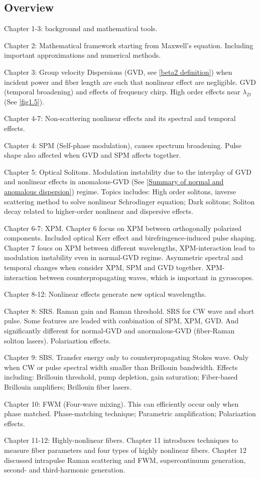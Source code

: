 \documentclass[12pt]{extarticle}
\numberwithin{equation}{section}
\numberwithin{figure}{section}
\numberwithin{table}{section}
\newcommand{\<}{\langle}
\renewcommand{\>}{\rangle}
\theoremstyle{definition}
\newcommand{\SubItem}[1]{
    {\setlength\itemindent{15pt} \item[-] #1}
}
\begin{document}
    \subsection{Overview}
        \begin{itemize}
            \item Chapter 1-3: background and mathematical tools.
                \SubItem{Chapter 2: Mathematical framework starting from Maxwell's equation. Including important approximations and numerical methods.}
                \SubItem{Chapter 3: Group velocity Dispersions (GVD, see \autoref{beta2 definition}) when incident power and fiber length are such that nonlinear effect are negligible. GVD (temporal broadening) and effects of frequency chirp. High order effects near $\lambda_D$ (See \autoref{fig1.5}).}
            \item Chapter 4-7: Non-scattering nonlinear effects and its spectral and temporal effects.
                \SubItem{Chapter 4: SPM (Self-phase modulation), causes spectrum broadening. Pulse shape also affected when GVD and SPM affects together.}
                \SubItem{Chapter 5: Optical Solitons. Modulation instability due to the interplay of GVD and nonlinear effects in anomalous-GVD (See \autoref{Summary of normal and anomalous dispersion}) regime. Topics includes: High order solitons, inverse scattering method to solve nonlinear Schrodinger equation; Dark solitons; Soliton decay related to higher-order nonlinear and dispersive effects.}
                \SubItem{Chapter 6-7: XPM. Chapter 6 focus on XPM between orthogonally polarized components. Included optical Kerr effect and birefringence-induced pulse shaping. Chapter 7 foucs on XPM between different wavelengths, XPM-interaction lead to modulation instability even in normal-GVD regime. Asymmetric spectral and temporal changes when consider XPM, SPM and GVD together. XPM-interaction between counterpropagating waves, which is important in gyroscopes.}
            \item Chapter 8-12: Nonlinear effects generate new optical wavelengths.
                \SubItem{Chapter 8: SRS. Raman gain and Raman threshold. SRS for CW wave and short pulse. Some features are leaded with conbination of SPM, XPM, GVD. And significantly different for normal-GVD and anormalous-GVD (fiber-Raman soliton lasers). Polariaztion effects.}
                \SubItem{Chapter 9: SBS. Transfer energy only to counterpropagating Stokes wave. Only when CW or pulse spectral width smaller than Brillouin bandwidth. Effects including: Brillouin threshold, pump depletion, gain saturation; Fiber-based Brillouin amplifiers; Brillouin fiber lasers.}
                \SubItem{Chapter 10: FWM (Four-wave mixing). This can efficiently occur only when phase matched. Phase-matching technique; Parametric amplification; Polariaztion effects.}
                \SubItem{Chapter 11-12: Highly-nonlinear fibers. Chapter 11 introduces techniques to measure fiber parameters and four types of highly nonlinear fibers. Chapter 12 discussed intrapulse Raman scattering and FWM, supercontinuum generation, second- and third-harmonic generation.}
        \end{itemize}
\end{document}
